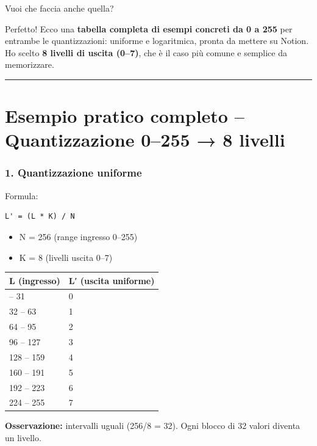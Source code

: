 \documentclass[
]{article}
\providecommand{\tightlist}{%
  \setlength{\itemsep}{0pt}\setlength{\parskip}{0pt}}
\begin{document}
Vuoi che faccia anche quella?

Perfetto! Ecco una \textbf{tabella completa di esempi concreti da 0 a 255} per entrambe le quantizzazioni: uniforme e logaritmica, pronta da mettere su Notion. Ho scelto \textbf{8 livelli di uscita (0--7)}, che è il caso più comune e semplice da memorizzare.

\begin{center}\rule{0.5\linewidth}{0.5pt}\end{center}

\hypertarget{esempio-pratico-completo-quantizzazione-0255-8-livelli}{%
\section{Esempio pratico completo -- Quantizzazione 0--255 → 8 livelli}\label{esempio-pratico-completo-quantizzazione-0255-8-livelli}}

\hypertarget{quantizzazione-uniforme-1}{%
\subsubsection{1. Quantizzazione uniforme}\label{quantizzazione-uniforme-1}}

Formula:

\begin{verbatim}
L' = (L * K) / N
\end{verbatim}

\begin{itemize}
\tightlist
\item
  N = 256 (range ingresso 0--255)
\item
  K = 8 (livelli uscita 0--7)
\end{itemize}

\begin{longtable}[]{@{}ll@{}}
\toprule\noalign{}
L (ingresso) & L′ (uscita uniforme) \\
\midrule\noalign{}
\endhead
\bottomrule\noalign{}
\endlastfoot
0 -- 31 & 0 \\
32 -- 63 & 1 \\
64 -- 95 & 2 \\
96 -- 127 & 3 \\
128 -- 159 & 4 \\
160 -- 191 & 5 \\
192 -- 223 & 6 \\
224 -- 255 & 7 \\
\end{longtable}

\textbf{Osservazione:} intervalli uguali (256/8 = 32). Ogni blocco di 32 valori diventa un livello.
\end{document}
